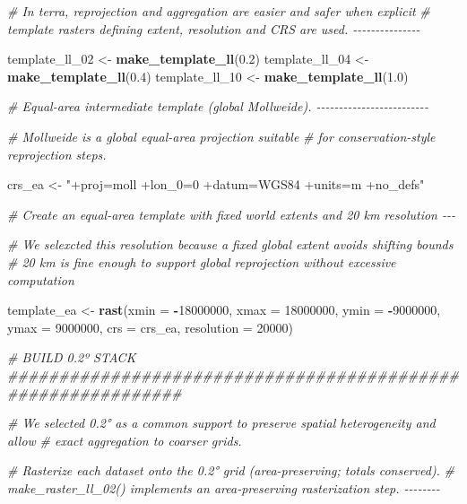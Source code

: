 \documentclass[
  11pt,
]{article}
\newenvironment{Shaded}{\begin{snugshade}}{\end{snugshade}}
\newcommand{\AttributeTok}[1]{\textcolor[rgb]{0.13,0.29,0.53}{#1}}
\newcommand{\CommentTok}[1]{\textcolor[rgb]{0.56,0.35,0.01}{\textit{#1}}}
\newcommand{\DecValTok}[1]{\textcolor[rgb]{0.00,0.00,0.81}{#1}}
\newcommand{\FloatTok}[1]{\textcolor[rgb]{0.00,0.00,0.81}{#1}}
\newcommand{\FunctionTok}[1]{\textcolor[rgb]{0.13,0.29,0.53}{\textbf{#1}}}
\newcommand{\NormalTok}[1]{#1}
\newcommand{\OtherTok}[1]{\textcolor[rgb]{0.56,0.35,0.01}{#1}}
\newcommand{\SpecialCharTok}[1]{\textcolor[rgb]{0.81,0.36,0.00}{\textbf{#1}}}
\newcommand{\StringTok}[1]{\textcolor[rgb]{0.31,0.60,0.02}{#1}}
\begin{document}
\begin{Shaded}
\begin{Highlighting}[]
\CommentTok{\# In terra, reprojection and aggregation are easier and safer when explicit}
\CommentTok{\# template rasters defining extent, resolution and CRS are used. {-}{-}{-}{-}{-}{-}{-}{-}{-}{-}{-}{-}{-}{-}{-}}

\NormalTok{template\_ll\_02 }\OtherTok{\textless{}{-}} \FunctionTok{make\_template\_ll}\NormalTok{(}\FloatTok{0.2}\NormalTok{)}
\NormalTok{template\_ll\_04 }\OtherTok{\textless{}{-}} \FunctionTok{make\_template\_ll}\NormalTok{(}\FloatTok{0.4}\NormalTok{)}
\NormalTok{template\_ll\_10 }\OtherTok{\textless{}{-}} \FunctionTok{make\_template\_ll}\NormalTok{(}\FloatTok{1.0}\NormalTok{)}

\CommentTok{\# Equal{-}area intermediate template (global Mollweide). {-}{-}{-}{-}{-}{-}{-}{-}{-}{-}{-}{-}{-}{-}{-}{-}{-}{-}{-}{-}{-}{-}{-}{-}{-}}

\CommentTok{\# Mollweide is a global equal{-}area projection suitable }
\CommentTok{\# for conservation{-}style reprojection steps.}

\NormalTok{crs\_ea }\OtherTok{\textless{}{-}} \StringTok{"+proj=moll +lon\_0=0 +datum=WGS84 +units=m +no\_defs"}

\CommentTok{\# Create an equal{-}area template with fixed world extents and 20 km resolution {-}{-}{-}}

\CommentTok{\# We selexcted this resolution because a fixed global extent avoids shifting bounds}
\CommentTok{\# 20 km is fine enough to support global reprojection without excessive computation}

\NormalTok{template\_ea }\OtherTok{\textless{}{-}} \FunctionTok{rast}\NormalTok{(}\AttributeTok{xmin =} \SpecialCharTok{{-}}\DecValTok{18000000}\NormalTok{, }\AttributeTok{xmax =} \DecValTok{18000000}\NormalTok{, }\AttributeTok{ymin =}  \SpecialCharTok{{-}}\DecValTok{9000000}\NormalTok{,}
                    \AttributeTok{ymax =}  \DecValTok{9000000}\NormalTok{, }\AttributeTok{crs  =}\NormalTok{ crs\_ea, }\AttributeTok{resolution =} \DecValTok{20000}\NormalTok{)}

\CommentTok{\# BUILD 0.2º STACK \#\#\#\#\#\#\#\#\#\#\#\#\#\#\#\#\#\#\#\#\#\#\#\#\#\#\#\#\#\#\#\#\#\#\#\#\#\#\#\#\#\#\#\#\#\#\#\#\#\#\#\#\#\#\#\#\#\#\#\#\#}

\CommentTok{\# We selected 0.2° as a common support to preserve spatial heterogeneity and allow }
\CommentTok{\# exact aggregation to coarser grids.}

\CommentTok{\# Rasterize each dataset onto the 0.2° grid (area{-}preserving; totals conserved).}
\CommentTok{\# make\_raster\_ll\_02() implements an area{-}preserving rasterization step. {-}{-}{-}{-}{-}{-}{-}{-}}


\end{Highlighting}
\end{Shaded}
\end{document}
